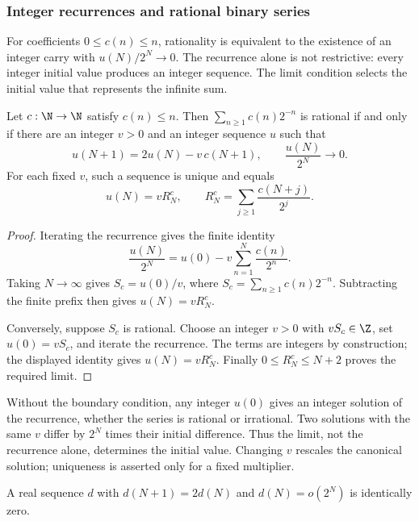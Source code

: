 \subsubsection{Integer recurrences and rational binary series}

For coefficients $0\le c(n)\le n$, rationality is equivalent to the
existence of an integer carry with $u(N)/2^N\to0$. The recurrence alone
is not restrictive: every integer initial value produces an integer
sequence. The limit condition selects the initial value that represents
the infinite sum.


\begin{thm}
\label{thm:binary-carry-criterion}
Let $c:\N\to\N$ satisfy $c(n)\le n$. Then
$\sum_{n\ge1}c(n)2^{-n}$ is rational if and only if there are an integer
$v>0$ and an integer sequence $u$ such that
\[
 u(N+1)=2u(N)-v\,c(N+1),\qquad \frac{u(N)}{2^N}\longrightarrow0.
\]
For each fixed $v$, such a sequence is unique and equals
\[
 u(N)=vR^c_N,\qquad R^c_N=\sum_{j\ge1}\frac{c(N+j)}{2^j}.
\]
\end{thm}

\begin{proof}
Iterating the recurrence gives the finite identity
\[
 \frac{u(N)}{2^N}=u(0)-v\sum_{n=1}^N\frac{c(n)}{2^n}.
\]
Taking $N\to\infty$ gives $S_c=u(0)/v$, where
$S_c=\sum_{n\ge1}c(n)2^{-n}$. Subtracting the finite prefix then gives
$u(N)=vR^c_N$.

Conversely, suppose $S_c$ is rational. Choose an integer $v>0$ with
$vS_c\in\Z$, set $u(0)=vS_c$, and iterate the recurrence. The terms
are integers by construction; the displayed identity gives
$u(N)=vR^c_N$. Finally $0\le R^c_N\le N+2$ proves the required limit.
\end{proof}

Without the boundary condition, any integer $u(0)$ gives an integer
solution of the recurrence, whether the series is rational or irrational.
Two solutions with the same $v$ differ by $2^N$ times their initial
difference. Thus the limit, not the recurrence alone, determines the
initial value. Changing $v$ rescales the canonical solution; uniqueness
is asserted only for a fixed multiplier.

\begin{prop}\label{prop:uniqueness-under-growth-condition}
A real sequence $d$ with $d(N{+}1)=2d(N)$ and $d(N)=o(2^N)$ is identically
zero.
\end{prop}

